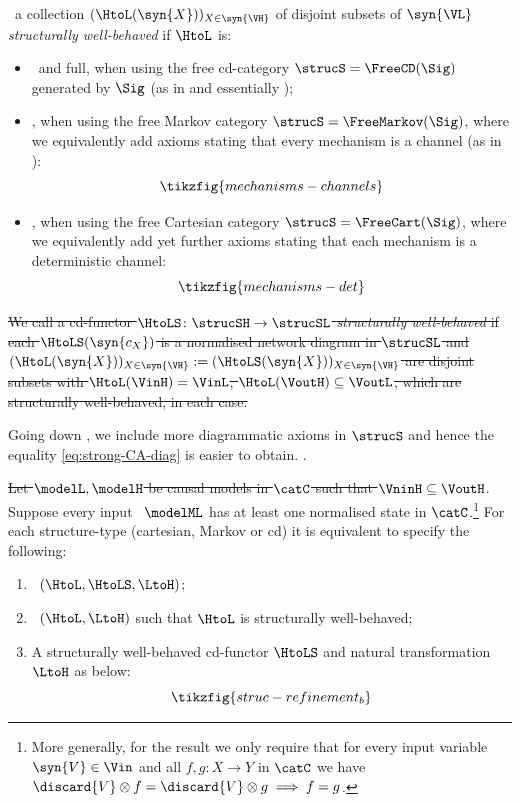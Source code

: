 \documentclass{article}
\begin{document}
\begin{definition} \label{def:struc-well-behavedness}
\ a 
collection $(\HtoL(\syn{X}))_{X \in \syn{\VH}}$ of disjoint subsets of $\syn{\VL}$ \emph{structurally well-behaved} if $\HtoL$ is: 
\begin{itemize}
\item 
\extrastrong\ and full, when using the free cd-category $\strucS = \FreeCD(\Sig)$ generated by $\Sig$ (as in  and essentially \cite{jacobs2019causal}); 
\item 
\extrastrong, when using the free Markov category $\strucS = \FreeMarkov(\Sig)$, where we equivalently add axioms stating that every mechanism is a channel (as in \cite{fritz2023free}):
\[
\tikzfig{mechanisms-channels}
\]
\item 
\strong, when using the free Cartesian category $\strucS = \FreeCart(\Sig)$, where we equivalently add yet further axioms stating that each mechanism is a deterministic channel: 
\[
\tikzfig{mechanisms-det}
\]
\end{itemize}
\st{
We call a cd-functor $\HtoLS \colon \strucSH \to \strucSL$ \emph{structurally well-behaved} if each $\HtoLS(\syn{c_X})$ is a normalised network diagram in $\strucSL$ and $(\HtoL(\syn{X}))_{X \in \syn{\VH}} := (\HtoLS(\syn{X}))_{X \in \syn{\VH}}$ are disjoint subsets with $\HtoL(\VinH) = \VinL$, $\HtoL(\VoutH) \subseteq \VoutL$, which are 
structurally well-behaved, in each case.
}
\end{definition}

\color{black}

Going down , we include more diagrammatic axioms in $\strucS$ and hence the equality \eqref{eq:strong-CA-diag} is easier to obtain. 
.
\begin{theorem} \label{Thm:strongCCAnew}
\st{Let $\modelL, \modelH$ be causal models in $\catC$ such that $\VninH \subseteq \VoutH$}. Suppose every input \ $\modelML$ has at least one normalised state in $\catC$.\footnote{More generally, for the result we only require that for every input variable $\syn{V} \in \Vin$ and all $f, g \colon X \to Y$ in $\catC$ we have $\discard{V} \otimes f = \discard{V} \otimes g \implies f = g$.} 
For each structure-type (cartesian, Markov or cd) it is equivalent to specify the following: 
\begin{enumerate}
\item \label{enum:mech-level-CCA}
\ $(\HtoL,\HtoLS,\LtoH)$;
\item \label{enum:constr-CCA-well}
\ $(\HtoL,\LtoH)$ such that $\HtoL$ is structurally well-behaved; 
\item \label{enum:pis-functor}
A structurally well-behaved cd-functor $\HtoLS$ and natural transformation $\LtoH$ as below:
\[
\tikzfig{struc-refinement_b}
\]
 \end{enumerate} 
\end{theorem}
\end{document}
